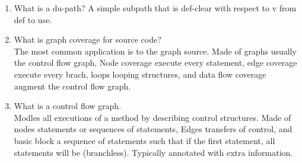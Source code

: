 \documentclass[10pt]{article}
\begin{document}
\begin{enumerate}
    \item What is a du-path?
          A simple subpath that is def-clear with respect to v from def to use.\\

    \item What is graph coverage for source code?\\
          The most common application is to the graph source. Made of graphs usually the control flow graph, Node coverage execute every statement, edge coverage execute every brach, loops looping structures, and data flow coverage
          augment the control flow graph.\\

    \item What is a control flow graph.\\
          Modles all executions of a method by describing control structures. Made of nodes statements or sequences of statements, Edges transfers of control, and basic block a sequence of statements
          such that if the first statement, all statements will be (branchless). Typically annotated with extra information.\\



\end{enumerate}
\end{document}

